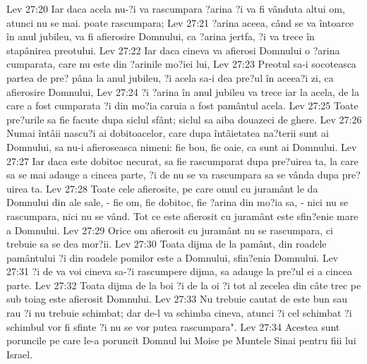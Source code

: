 Lev 27:20  Iar daca acela nu-?i va rascumpara ?arina ?i va fi vânduta altui om, atunci nu se mai. poate rascumpara;
Lev 27:21  ?arina aceea, când se va întoarce în anul jubileu, va fi afierosire Domnului, ca ?arina jertfa, ?i va trece în stapânirea preotului.
Lev 27:22  Iar daca cineva va afierosi Domnului o ?arina cumparata, care nu este din ?arinile mo?iei lui,
Lev 27:23  Preotul sa-i socoteasca partea de pre? pâna la anul jubileu, ?i acela sa-i dea pre?ul în aceea?i zi, ca afierosire Domnului,
Lev 27:24  ?i ?arina în anul jubileu va trece iar la acela, de la care a fost cumparata ?i din mo?ia caruia a fost pamântul acela.
Lev 27:25  Toate pre?urile sa fie facute dupa siclul sfânt; siclul sa aiba douazeci de ghere.
Lev 27:26  Numai întâii nascu?i ai dobitoacelor, care dupa întâietatea na?terii sunt ai Domnului, sa nu-i afieroseasca nimeni: fie bou, fie oaie, ca sunt ai Domnului.
Lev 27:27  Iar daca este dobitoc necurat, sa fie rascumparat dupa pre?uirea ta, la care sa se mai adauge a cincea parte, ?i de nu se va rascumpara sa se vânda dupa pre?uirea ta.
Lev 27:28  Toate cele afierosite, pe care omul cu juramânt le da Domnului din ale sale, - fie om, fie dobitoc, fie ?arina din mo?ia sa, - nici nu se rascumpara, nici nu se vând. Tot ce este afierosit cu juramânt este sfin?enie mare a Domnului.
Lev 27:29  Orice om afierosit cu juramânt nu se rascumpara, ci trebuie sa se dea mor?ii.
Lev 27:30  Toata dijma de la pamânt, din roadele pamântului ?i din roadele pomilor este a Domnului, sfin?enia Domnului.
Lev 27:31  ?i de va voi cineva sa-?i rascumpere dijma, sa adauge la pre?ul ei a cincea parte.
Lev 27:32  Toata dijma de la boi ?i de la oi ?i tot al zecelea din câte trec pe sub toiag este afierosit Domnului.
Lev 27:33  Nu trebuie cautat de este bun sau rau ?i nu trebuie schimbat; dar de-l va schimba cineva, atunci ?i cel schimbat ?i schimbul vor fi sfinte ?i nu se vor putea rascumpara".
Lev 27:34  Acestea sunt poruncile pe care le-a poruncit Domnul lui Moise pe Muntele Sinai pentru fiii lui Israel.


